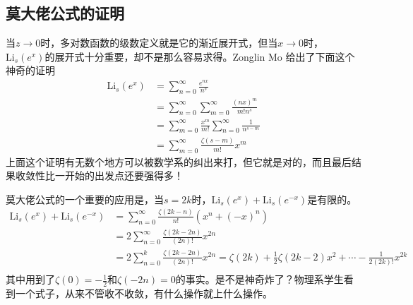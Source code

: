 \documentclass[a4paper,11pt]{ctexart}
\newcommand{\bea}{\begin{equation}\begin{aligned}}
\newcommand{\eea}{\end{aligned}\end{equation}}
\newcommand{\Li}[1]{\mathrm{Li}_{#1}}
\begin{document}
\subsection{莫大佬公式的证明}
当$z \to 0$时，多对数函数的级数定义就是它的渐近展开式，但当$x \to 0$时，$\Li{s}(e^x)$的展开式十分重要，却不是那么容易求得。Zonglin Mo 给出了下面这个神奇的证明
\bea
\Li{s}(e^x) &= \sum_{n=0}^\infty \frac{e^{nx}}{n^s}\\
&= \sum_{n=0}^\infty \sum_{m = 0}^\infty \frac{(nx)^m}{m! n^s} \\
&= \sum_{m=0}^\infty \frac{x^m}{m!} \sum_{n=0}^\infty \frac{1}{n^{s-m}} \\
&= \sum_{m=0}^\infty \frac{\zeta(s-m)}{m!} x^m
\eea
上面这个证明有无数个地方可以被数学系的纠出来打，但它就是对的，而且最后结果收敛性比一开始的出发点还要强得多！\par
莫大佬公式的一个重要的应用是，当$s = 2k$时，$\Li{s}(e^x) + \Li{s}(e^{-x})$是有限的。
\bea
\Li{s}(e^x) + \Li{s}(e^{-x}) &= \sum_{n=0}^\infty \frac{\zeta(2k-n)}{n!} \left( x^n + (-x)^n\right) \\
&= 2\sum_{n=0}^\infty \frac{\zeta(2k-2n)}{(2n)!} x^{2n} \\
&= 2\sum_{n=0}^k \frac{\zeta(2k-2n)}{(2n)!} x^{2n} = \zeta(2k) + \frac{1}{2}\zeta(2k-2)x^2 + \cdots - \frac{1}{2(2k)!}x^{2k} \\
\eea
其中用到了$\zeta(0) = - \frac{1}{2}$和$\zeta(-2n) = 0$的事实。是不是神奇炸了？物理系学生看到一个式子，从来不管收不收敛，有什么操作就上什么操作。
\end{document}
